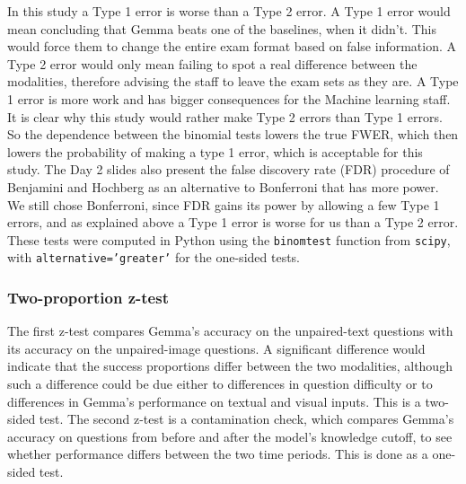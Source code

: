 \documentclass{article}
\begin{document}
In this study a Type 1 error is worse than a Type 2 error. A Type 1 error would mean concluding that Gemma beats one of the baselines, when it didn't. This would force them to change the entire exam format based on false information. A Type 2 error would only mean failing to spot a real difference between the modalities, therefore advising the staff to leave the exam sets as they are. A Type 1 error is more work and has bigger consequences for the Machine learning staff. It is clear why this study would rather make Type 2 errors than Type 1 errors. So the dependence between the binomial tests lowers the true FWER, which then lowers the probability of making a type 1 error, which is acceptable for this study.
\newline\newline
The Day 2 slides also present the false discovery rate (FDR) procedure of Benjamini and Hochberg as an alternative to Bonferroni that has more power\supercite{das2026day2}. We still chose Bonferroni, since FDR gains its power by allowing a few Type 1 errors, and as explained above a Type 1 error is worse for us than a Type 2 error.
\newline\newline
These tests were computed in Python using the \texttt{binomtest} function from \texttt{scipy}, with \texttt{alternative='greater'} for the one-sided tests.

\subsubsection{Two-proportion z-test}

The first z-test compares Gemma's accuracy on the unpaired-text questions with its accuracy on the unpaired-image questions. A significant difference would indicate that the success proportions differ between the two modalities, although such a difference could be due either to differences in question difficulty or to differences in Gemma's performance on textual and visual inputs. This is a two-sided test. The second z-test is a contamination check, which compares Gemma's accuracy on questions from before and after the model's knowledge cutoff, to see whether performance differs between the two time periods. This is done as a one-sided test.
\end{document}
